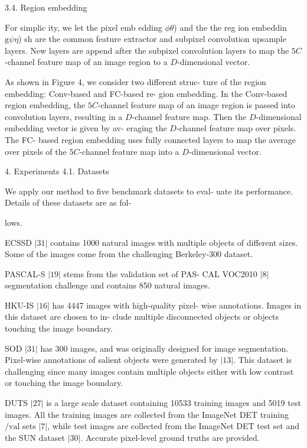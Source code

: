 \documentclass[a4paper,10pt]{article}
\begin{document}
3.4. Region embedding

$\mathrm{F}$or simplic ity, we let the pixel emb edding $\phi \theta$) and the the reg ion embeddin $\mathrm{g}\psi \eta$) sh are the common feature extractor and subpixel convolution upsample layers. New layers are append after the subpixel convolution layers to map the $5C$-channel feature map of an image region to a $D$-dimensional vector.

As shown in Figure 4, we consider two different struc- ture of the region embedding: Conv-based and FC-based re- gion embedding. In the Conv-based region embedding, the $5C$-channel feature map of an image region is passed into convolution layers, resulting in a $D$-channel feature map. Then the $D$-dimensional embedding vector is given by av- eraging the $D$-channel feature map over pixels. The FC- based region embedding uses fully connected layers to map the average over pixels of the $5C$-channel feature map into a $D$-dimensional vector.

4. Experiments 4.1. Datasets

We apply our method to five benchmark datasets to eval- uate its performance. Details of these datasets are as fol-

lows.

ECSSD $|31|$ contains 1000 natural images with multiple objects of different sizes. Some of the images come from the challenging Berkeley-300 dataset.

PASCAL-S $|19|$ stems from the validation set of PAS- CAL VOC2010 $|8|$ segmentation challenge and contains 850 natural images.

HKU-IS $|16|$ has 4447 images with high-quality pixel- wise annotations. Images in this dataset are chosen to in- clude multiple disconnected objects or objects touching the image boundary.

SOD $|31|$ has 300 images, and was originally designed for image segmentation. Pixel-wise annotations of salient objects were generated by $|13|$. This dataset is challenging since many images contain multiple objects either with low contrast or touching the image boundary.

DUTS $|27|$ is a large scale dataset containing 10533 training images and 5019 test images. All the training images are collected from the ImageNet DET training$/\mathrm{v}\mathrm{a}\mathrm{l}$ sets $|7|$, while test images are collected from the ImageNet DET test set and the SUN dataset $|30|$. Accurate pixel-level ground truths are provided.
\end{document}

